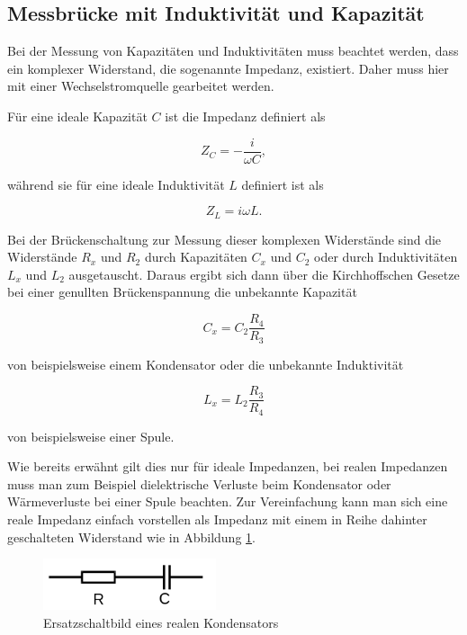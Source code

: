 \subsection{Messbrücke mit Induktivität und Kapazität}

Bei der Messung von Kapazitäten und Induktivitäten muss beachtet werden, dass
ein komplexer Widerstand, die sogenannte Impedanz, existiert.
Daher muss hier mit einer Wechselstromquelle gearbeitet werden.

\newpage

Für eine ideale Kapazität $C$ ist die Impedanz definiert als

\begin{equation}
  Z_C = - \frac{i}{\omega C} ,
\end{equation}

während sie für eine ideale Induktivität $L$ definiert ist als

\begin{equation}
  Z_L = i \omega L .
\end{equation}

Bei der Brückenschaltung zur Messung dieser komplexen Widerstände sind
die Widerstände $R_x$ und $R_2$ durch Kapazitäten $C_x$ und $C_2$ oder
durch Induktivitäten $L_x$ und $L_2$ ausgetauscht.
Daraus ergibt sich dann über die Kirchhoffschen Gesetze bei einer
genullten Brückenspannung die unbekannte Kapazität

\begin{equation}
  C_x = C_2\frac{R_4}{R_3}
  \label{eqn:KapId}
\end{equation}

von beispielsweise einem Kondensator oder die unbekannte Induktivität

\begin{equation}
  L_x = L_2\frac{R_3}{R_4}
  \label{eqn:IndId}
\end{equation}

von beispielsweise einer Spule.

Wie bereits erwähnt gilt dies nur für ideale Impedanzen, bei realen
Impedanzen muss man zum Beispiel dielektrische Verluste beim Kondensator
oder Wärmeverluste bei einer Spule beachten. Zur Vereinfachung kann man
sich eine reale Impedanz einfach vorstellen als Impedanz mit einem in Reihe
dahinter geschalteten Widerstand wie in Abbildung \ref{fig:ReiheImp}.

\begin{figure}
  \centering
  \includegraphics[height=1.5cm]{ReiheImp.png}
  \caption{Ersatzschaltbild eines realen Kondensators \cite{anleitung}}
  \label{fig:ReiheImp}
\end{figure}

